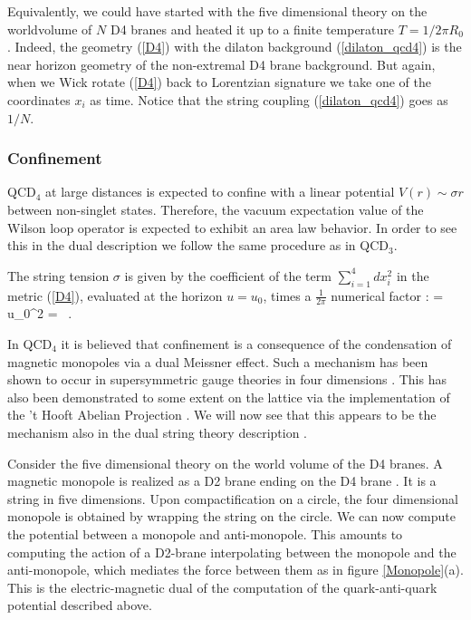 Equivalently, we could have started with the five dimensional 
theory on the worldvolume 
of $N$ D4 branes and heated it up to a finite 
temperature $T=1/2 \pi R_0$. 
Indeed, the geometry (\ref{D4}) with the dilaton
background (\ref{dilaton_qcd4}) is the near horizon geometry
of the non-extremal D4 brane background. But again,  when we 
Wick rotate (\ref{D4}) back to Lorentzian signature we take one of 
the coordinates $x_i$ as time. Notice that the string coupling
(\ref{dilaton_qcd4}) goes as $1/N$.


\subsubsection{Confinement}

QCD$_4$ at large distances is expected to confine with a linear
potential $V(r) \sim \sigma r$ between non-singlet states.  Therefore,
the vacuum expectation value of the Wilson loop operator is expected
to exhibit an area law behavior.  In order to see this in the dual
description we follow the same procedure as in QCD$_3$.
 
The string tension $\sigma$ is given by the coefficient of the term
$\sum_{i=1}^4 dx_i^2$ in the metric (\ref{D4}), evaluated at the
horizon $u=u_0$, times a $\frac{1}{2\pi}$ numerical factor :
\beq
\sigma =  \lambda u_0^2 =  \ .
\label{tension4}
\eeq

In QCD$_4$ it is believed that confinement is a consequence of the
condensation of magnetic monopoles via a dual Meissner effect.  Such a
mechanism has been shown to occur in supersymmetric gauge theories in
four dimensions
\cite{Seiberg:1994mc}.
This has also been demonstrated to some extent on the lattice via the
implementation of the 't Hooft Abelian Projection \cite{Hooft:1981to}.
We will now see that this appears to be the mechanism also in the dual
string theory description \cite{Gross:1998gk}.

Consider the five dimensional theory on the world volume of the D4
branes.  A magnetic monopole is realized as a D2 brane ending on the
D4 brane \cite{Douglas:1996du}. It is a string in five dimensions.
Upon compactification on a circle, the four dimensional monopole is
obtained by wrapping the string on the circle. We can now compute the
potential between a monopole and anti-monopole.  This amounts to
computing the action of a D2-brane interpolating between the monopole
and the anti-monopole, which mediates the force between them as in
figure \ref{Monopole}(a).  This is the electric-magnetic dual of the
computation of the quark-anti-quark potential described above.

